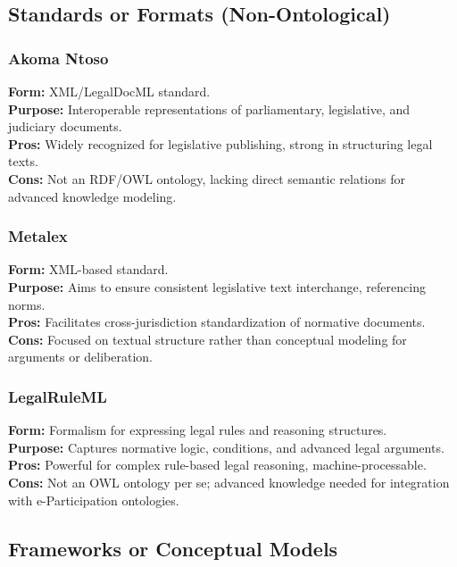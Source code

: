 \documentclass[11pt,a4paper]{article}
\begin{document}
\subsection{Standards or Formats (Non-Ontological)}

\subsubsection{Akoma Ntoso \cite{AkomaNtoso}}
\textbf{Form:} XML/LegalDocML standard.\\
\textbf{Purpose:} Interoperable representations of parliamentary, legislative, and judiciary documents.\\
\textbf{Pros:} Widely recognized for legislative publishing, strong in structuring legal texts.\\
\textbf{Cons:} Not an RDF/OWL ontology, lacking direct semantic relations for advanced knowledge modeling.

\subsubsection{Metalex \cite{Metalex}}
\textbf{Form:} XML-based standard.\\
\textbf{Purpose:} Aims to ensure consistent legislative text interchange, referencing norms.\\
\textbf{Pros:} Facilitates cross-jurisdiction standardization of normative documents.\\
\textbf{Cons:} Focused on textual structure rather than conceptual modeling for arguments or deliberation.

\subsubsection{LegalRuleML \cite{Athan2015}}
\textbf{Form:} Formalism for expressing legal rules and reasoning structures.\\
\textbf{Purpose:} Captures normative logic, conditions, and advanced legal arguments.\\
\textbf{Pros:} Powerful for complex rule-based legal reasoning, machine-processable.\\
\textbf{Cons:} Not an OWL ontology per se; advanced knowledge needed for integration with e-Participation ontologies.

\subsection{Frameworks or Conceptual Models}
\end{document}
